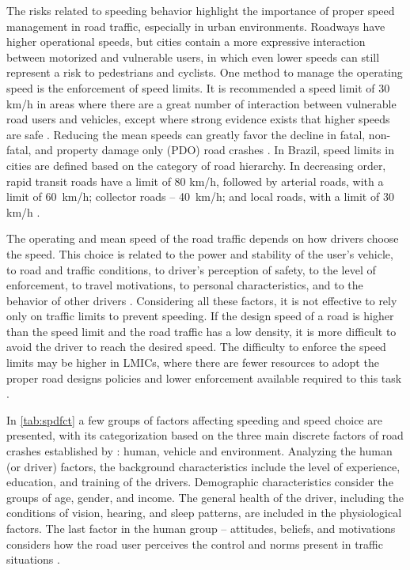 The risks related to speeding behavior highlight the importance of proper speed management in road traffic, especially in urban environments. Roadways have higher operational speeds, but cities contain a more expressive interaction between motorized and vulnerable users, in which even lower speeds can still represent a risk to pedestrians and cyclists. One method to manage the operating speed is the enforcement of speed limits. It is recommended a speed limit of 30 km/h in areas where there are a great number of interaction between vulnerable road users and vehicles, except where strong evidence exists that higher speeds are safe \cite{WHO2020,whoGlobalPlanDecade2021}. Reducing the mean speeds can greatly favor the decline in fatal, non-fatal, and property damage only (PDO) road crashes \cite{Elvik2013}. In Brazil, speed limits in cities are defined based on the category of road hierarchy. In decreasing order, rapid transit roads have a limit of 80 km/h, followed by arterial roads, with a limit of 60 km/h; collector roads – 40 km/h; and local roads, with a limit of 30 km/h \cite{Brasil1997}.

The operating and mean speed of the road traffic depends on how drivers choose the speed. This choice is related to the power and stability of the user's vehicle, to road and traffic conditions, to driver's perception of safety, to the level of enforcement, to travel motivations, to personal characteristics, and to the behavior of other drivers \cite{Mohan2016a, Shinar2017}. Considering all these factors, it is not effective to rely only on traffic limits to prevent speeding. If the design speed of a road is higher than the speed limit and the road traffic has a low density, it is more difficult to avoid the driver to reach the desired speed. The difficulty to enforce the speed limits may be higher in LMICs, where there are fewer resources to adopt the proper road designs policies and lower enforcement available required to this task \cite{Mohan2016a}. 

In \autoref{tab:spdfct} a few groups of factors affecting speeding and speed choice are presented, with its categorization based on the three main discrete factors of road crashes established by \textcite{Haddon1980}: human, vehicle and environment. Analyzing the human (or driver) factors, the background characteristics include the level of experience, education, and training of the drivers. Demographic characteristics consider the groups of age, gender, and income. The general health of the driver, including the conditions of vision, hearing, and sleep patterns, are included in the physiological factors. The last factor in the human group – attitudes, beliefs, and motivations considers how the road user perceives the control and norms present in traffic situations \cite{Richard2013a}.  

